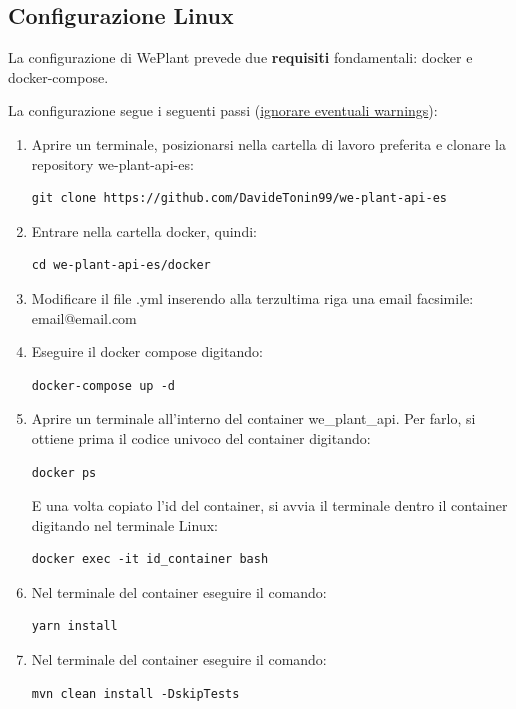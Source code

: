 \documentclass[a4paper]{article}
\begin{document}
	\subsection{Configurazione Linux}
	
	La configurazione di WePlant prevede due \textbf{requisiti} fondamentali: \textsf{docker} e \textsf{docker-compose}.\newline
	
	\noindent
	La configurazione segue i seguenti passi (\underline{ignorare eventuali warnings}):
	\begin{enumerate}
		\item Aprire un terminale, posizionarsi nella cartella di lavoro preferita e clonare la repository \textsf{we-plant-api-es}:
		\begin{lstlisting}
git clone https://github.com/DavideTonin99/we-plant-api-es\end{lstlisting}
		
		\item Entrare nella cartella docker, quindi:
		\begin{lstlisting}
cd we-plant-api-es/docker\end{lstlisting}

		\item Modificare il file \textsf{.yml} inserendo alla terzultima riga una email facsimile: \textsf{email@email.com}
		
		\item Eseguire il \textsf{docker compose} digitando:
		\begin{lstlisting}
docker-compose up -d\end{lstlisting}
		
		\item Aprire un terminale all'interno del container \textsf{we\_plant\_api}. Per farlo, si ottiene prima il codice univoco del container digitando:
		\begin{lstlisting}
docker ps\end{lstlisting}
		E una volta copiato l'id del container, si avvia il terminale dentro il container digitando nel terminale Linux:
		\begin{lstlisting}
docker exec -it id_container bash\end{lstlisting}
		
		\item Nel terminale del container eseguire il comando:
		\begin{lstlisting}
yarn install\end{lstlisting}
		
		\item Nel terminale del container eseguire il comando:
		\begin{lstlisting}
mvn clean install -DskipTests\end{lstlisting}
	\end{enumerate}
\end{document}
